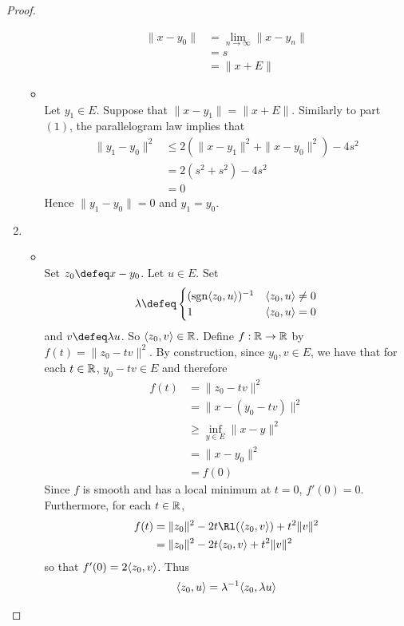 \documentclass{book}
\begin{document}
\begin{proof}
\begin{enumerate}
\begin{itemize}
\begin{align*}
				\|x-y_0\|
				& = \lim_{n \rightarrow \infty} \|x - y_n\| \\
				& = s \\
				& = \|x + E\|
			\end{align*}
			\item {} \\
			Let $y_1 \in E$. Suppose that $\|x-y_1\| = \|x + E\|$. Similarly to part $(1)$, the parallelogram law implies that 
			\begin{align*}
				\|y_1 - y_0\|^2 
				& \leq 2(\|x - y_1\|^2 + \|x-y_0\|^2) - 4s^2 \\
				& = 2(s^2 + s^2) - 4s^2 \\
				& = 0
			\end{align*}
			Hence $\|y_1 - y_0\| = 0$ and $y_1 = y_0$. 
		\end{itemize}
		\item 
		\begin{itemize}
			\item {} \\
			Set $z_0 \defeq x - y_0$. Let $u \in E$. Set 
			\[
			\lam \defeq 
			\begin{cases}
				(\sgn\l z_0, u \r)^{-1} & \l z_0, u \r \neq 0 \\
				1 & \l z_0, u \r = 0
			\end{cases}
			\] and $v \defeq \lam u$. So $\langle z_0, v \rangle \in \mathbb{R}$. Define $f: \mathbb{R} \rightarrow \mathbb{R}$ by $f(t) = \|z_0 - tv\|^2$.
			By construction, since $y_0,v \in E$, we have that for each $t \in \mathbb{R}$, $y_0 - tv \in E$ and therefore
			\begin{align*}
				f(t)
				& = \|z_0 - tv\|^2 \\
				& = \|x - (y_0 - tv)\|^2 \\
				& \geq \inf_{y \in E} \|x - y\|^2 \\
				& = \|x - y_0\|^2 \\
				& = f(0)
			\end{align*}
			Since $f$ is smooth and has a local minimum at $t=0$, $f'(0) = 0$. Furthermore, for each $t \in \mathbb{R}$, 
			\begin{align*}
				f(t) 
				& = \|z_0\|^2 - 2 t \Rl(\l z_0, v \r) + t^2\|v\|^2 \\
				& = \|z_0\|^2 - 2 t \l z_0, v \r + t^2\|v\|^2 
			\end{align*}
			so that $f'(0) =  2 \langle z_0, v \rangle$. Thus 
			\begin{align*}
				\l z_0, u \r 
				& = \lam^{-1} \l z_0, \lam u \r \\

\end{align*}
\end{itemize}
\end{enumerate}
\end{proof}
\end{document}
